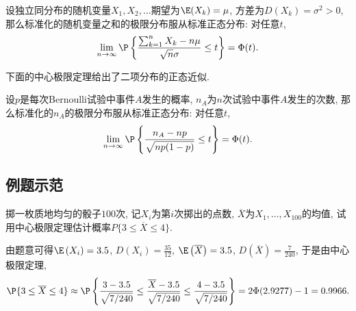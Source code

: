 \documentclass[11pt]{ctexart}
\begin{document}
\begin{theorem}[独立同分布的中心极限定理]
	设独立同分布的随机变量$X_1, X_2, \dots$期望为$\E(X_k) = \mu$, 方差为$D(X_k) = \sigma^2 > 0$, 那么标准化的随机变量之和的极限分布服从标准正态分布: 对任意$t$, 
	\begin{equation*}
		\lim_{n \to \infty} \P \left\{ \frac{\sum_{k=1}^n X_k - n \mu}{\sqrt{n} \sigma} \leq t \right\}
		= \Phi(t). 
	\end{equation*}
\end{theorem}

下面的中心极限定理给出了二项分布的正态近似. 

\begin{theorem}
	设$p$是每次Bernoulli试验中事件$A$发生的概率, $n_A$为$n$次试验中事件$A$发生的次数, 那么标准化的$n_A$的极限分布服从标准正态分布: 对任意$t$, 
	\begin{equation*}
		\lim_{n \to \infty} \P \left\{ \frac{n_A - np}{\sqrt{n p (1-p)}} \leq t \right\}
		= \Phi(t). 
	\end{equation*}
\end{theorem}

\subsection{例题示范}

\begin{example}
	掷一枚质地均匀的骰子$100$次, 记$X_i$为第$i$次掷出的点数, $\overline X$为$X_1, \dots, X_{100}$的均值, 试用中心极限定理估计概率$P\{3 \leq \overline{X} \leq 4\}$.
\end{example}
\begin{solution}
	由题意可得$\E\left(X_i\right)=3.5$, $D(X_i)=\frac{35}{12}$, $\E\left(\overline X\right)=3.5$, $D(\overline X)=\frac{7}{240}$, 于是由中心极限定理, 
	\begin{align*}
		\P\{3 \leq \overline{X} \leq 4\} 
		\approx 
		\P \left\{ \frac{3 - 3.5}{\sqrt{7 / 240}} \leq \frac{\overline{X} - 3.5}{\sqrt{7 / 240}} \leq \frac{4 - 3.5}{\sqrt{7 / 240}} \right\}
		= 2 \Phi(2.9277)-1
		=0.9966. 
	\end{align*}
\end{solution}
\end{document}
